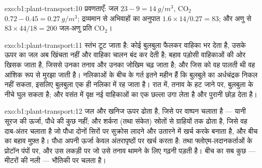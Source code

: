 \begin{solution}{exo:b1:plant-transport:10}
प्रवणताएँ: जल $23 - 9 = \qty{14}{g/m^3}$, $\mathrm{CO_2}$ $0.72 -
0.45 = \qty{0.27}{g/m^3}$; द्रव्यमान से अभिवाहों का अनुपात $1.6\times 14/0.27 = 83$;
और अणु से $83\times 44/18 = 200$ जल-अणु प्रति $\mathrm{CO_2}$।
\end{solution}

\begin{solution}{exo:b1:plant-transport:11}
स्तंभ टूट जाता है: कोई बुलबुला फैलकर वाहिका भर देता है, उसके ऊपर का
जल अब खिंचता नहीं और वाहिका चालन बंद कर देती है; बहाव
पड़ोसी वाहिकाओं की ओर खिसक जाता है, जिससे उनका तनाव और उनका
जोखिम चढ़ जाता है; और जिस  को वह पालती थी वह आंशिक रूप से मुरझा जाती
है। नलिकाओं के बीच के गर्त इतने महीन हैं कि बुलबुले का अर्धचंद्रक निकल
नहीं सकता, इसलिए बुलबुला एक ही नलिका में रह जाता है। रात में, तनाव के
हट जाने पर, बुलबुला  के नीचे घुल सकता है; और वसंत में वृक्ष नई
वाहिकाओं का एक छल्ला उगा लेता है और पुरानी छोड़ देता है।
\end{solution}

\begin{solution}{exo:b1:plant-transport:12}
 जल और खनिज ऊपर ढोता है, जिसे  पर वाष्पन चलाता है
--- यानी सूरज की ऊर्जा, पौधे की कुछ नहीं; और 
शर्करा (तथा संकेत) स्रोतों से ग्राहियों तक ढोता है, जिसे वह दाब-अंतर
चलाता है जो पौधा दोनों सिरों पर सुक्रोस लादने और उतारने में  खर्च करके
बनाता है, और बीच का बहाव मुफ़्त है। पौधा अपनी ऊर्जा केवल अंतरापृष्ठों पर
खर्च करता है:  तथा फ्लोएम-लदानकर्ताओं के प्रोटॉन पंपों पर,
और उस लकड़ी पर जो उसे तनाव थामने के लिए गढ़नी पड़ती है। बीच का सब कुछ
--- मीटरों की नली --- भौतिकी पर चलता है।
\end{solution}

